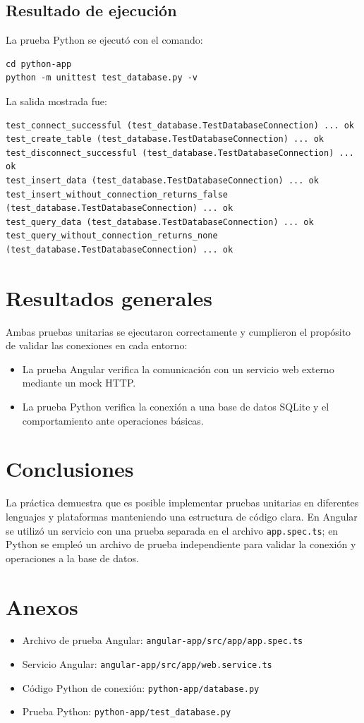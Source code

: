 \documentclass[12pt]{article}
\begin{document}
\subsection{Resultado de ejecución}
La prueba Python se ejecutó con el comando:
\begin{verbatim}
cd python-app
python -m unittest test_database.py -v
\end{verbatim}

\noindent La salida mostrada fue:
\begin{verbatim}
test_connect_successful (test_database.TestDatabaseConnection) ... ok
test_create_table (test_database.TestDatabaseConnection) ... ok
test_disconnect_successful (test_database.TestDatabaseConnection) ... ok
test_insert_data (test_database.TestDatabaseConnection) ... ok
test_insert_without_connection_returns_false (test_database.TestDatabaseConnection) ... ok
test_query_data (test_database.TestDatabaseConnection) ... ok
test_query_without_connection_returns_none (test_database.TestDatabaseConnection) ... ok
\end{verbatim}

\section{Resultados generales}
Ambas pruebas unitarias se ejecutaron correctamente y cumplieron el propósito de validar las conexiones en cada entorno:
\begin{itemize}
    \item La prueba Angular verifica la comunicación con un servicio web externo mediante un mock HTTP.
    \item La prueba Python verifica la conexión a una base de datos SQLite y el comportamiento ante operaciones básicas.
\end{itemize}

\section{Conclusiones}
La práctica demuestra que es posible implementar pruebas unitarias en diferentes lenguajes y plataformas manteniendo una estructura de código clara. En Angular se utilizó un servicio con una prueba separada en el archivo \texttt{app.spec.ts}; en Python se empleó un archivo de prueba independiente para validar la conexión y operaciones a la base de datos.

\section{Anexos}
\begin{itemize}
    \item Archivo de prueba Angular: \texttt{angular-app/src/app/app.spec.ts}
    \item Servicio Angular: \texttt{angular-app/src/app/web.service.ts}
    \item Código Python de conexión: \texttt{python-app/database.py}
    \item Prueba Python: \texttt{python-app/test_database.py}
\end{itemize}
\end{document}
